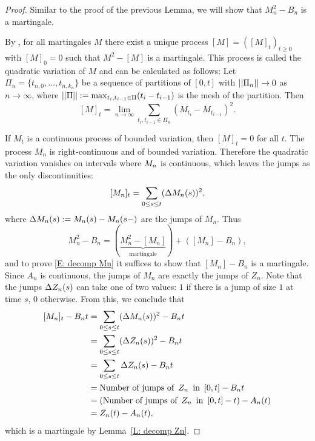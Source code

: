 \begin{proof} \label{P: decomp Mn}
	Similar to the proof of the previous Lemma, we will show that $M_n^2 - B_n$ is a martingale.
	
	By \cite[Theorem 21.70, p.471]{Klenke2013}, 
	for all martingales $M$ there exist a unique process $[M] = ([M]_t)_{t\geq 0}$ with $[M]_0 = 0$ such that
	$M^2 - [M]$	is a martingale.
	This process is called the quadratic variation of $M$ and can be calculated as follows:
	Let $\Pi_n = \{ t_{n,0}, \dots, t_{n,k_n} \}$ be a sequence of partitions of $[0,t]$
	with $||\Pi_n|| \rightarrow 0$ as $n \rightarrow \infty$, 
	where $||\Pi|| := \max_{t_i, t_{i-1} \in \Pi} (t_i - t_{i-1})$ is the mesh of the partition.
	Then
	\begin{equation} \label{E: def quadratic variation}
		[M]_t = \lim_{n \rightarrow \infty} \sum_{t_i, t_{i-1} \in \Pi_n}(M_{t_i} - M_{t_{i-1}})^2.
	\end{equation}
	
	If $M_t$ is a continuous process of bounded variation, then $[M]_t = 0$ for all $t$.
	The process $M_n$ is right-continuous and of bounded variation.
	Therefore the quadratic variation vanishes on intervals where $M_n$ is continuous, 
	which leaves the jumps as the only discontinuities:
	\begin{equation}
	[M_n]_{t} = \sum_{0 \leq s \leq t} (\Delta M_n(s))^2,
	\end{equation}
	where $\Delta M_n(s) := M_n(s) - M_n(s-)$ are the jumps of $M_n$.
	Thus
	\begin{equation}
	M_n^2 - B_n = (\underbrace{M_n^2 - [M_n]}_{\text{martingale}}) + ([M_n] - B_n),
	\end{equation}
	and to prove \eqref{E: decomp Mn} it suffices to show that $[M_n] - B_n$ is a martingale.
	Since $A_n$ is continuous, the jumps of $M_n$ are exactly the jumps of $Z_n$.
	Note that the jumps $\Delta Z_n(s)$ can take one of two values: 
	$1$ if there is a jump of size $1$ at time $s$, 0 otherwise.
	From this, we conclude that
	\begin{align*}
	[M_n]_{t} - B_n{t}
	&= \sum_{0 \leq s \leq t} (\Delta M_n(s))^2 - B_n{t} \\
	&= \sum_{0 \leq s \leq t} (\Delta Z_n(s))^2 - B_n{t} \\
	&= \sum_{0 \leq s \leq t} \Delta Z_n(s) - B_n{t} \\
	&= \text{Number of jumps of} \enspace Z_n \enspace \text{in} \enspace [0,t] - B_n{t} \\
	&= (\text{Number of jumps of} \enspace Z_n \enspace \text{in} \enspace [0,t] - t) - A_n(t) \\
	&= Z_n(t) - A_n(t),
	\end{align*}
	which is a martingale by Lemma~\ref{L: decomp Zn}.
\end{proof}




